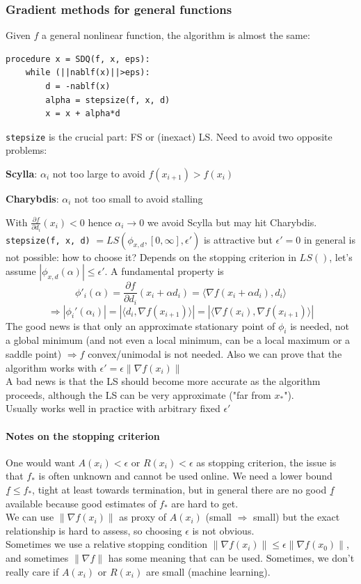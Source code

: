 \documentclass[10pt]{report}
\begin{document}
\subsubsection{Gradient methods for general functions}
Given $f$ a general nonlinear function, the algorithm is almost the same:
\begin{lstlisting}[style=myPython]
procedure x = SDQ(f, x, eps):
	while (||nablf(x)||>eps):
		d = -nablf(x)
		alpha = stepsize(f, x, d)
		x = x + alpha*d
\end{lstlisting}
\texttt{stepsize} is the crucial part: FS or (inexact) LS. Need to avoid two opposite problems:
\begin{list}{}{}
	\item \textbf{Scylla}: $\alpha_i$ not too large to avoid $f(x_{i+1}) > f(x_i)$
	\item \textbf{Charybdis}: $\alpha_i$ not too small to avoid stalling
\end{list}
With $\frac{\partial f}{\partial d_i}(x_i)<0$ hence $\alpha_i\rightarrow 0$ we avoid Scylla but may hit Charybdis.\\
\texttt{stepsize(f, x, d)} $= LS(\phi_{x,d}, [0,\infty], \epsilon')$ is attractive but $\epsilon' = 0$ in general is not possible: how to choose it? Depends on the stopping criterion in $LS()$, let's assume $|\phi_{x,d}(\alpha)| \leq \epsilon'$. A fundamental property is $$\phi'_i(\alpha) = \frac{\partial f}{\partial d_i}(x_i + \alpha d_i) = \langle\nabla f(x_i+\alpha d_i), d_i\rangle$$
$$\Rightarrow |\phi_i'(\alpha_i)| = |\langle d_i, \nabla f(x_{i+1})\rangle| = |\langle \nabla f(x_i),\nabla f(x_{i+1})\rangle|$$
The good news is that only an approximate stationary point of $\phi_i$ is needed, not a global minimum (and not even a local minimum, can be a local maximum or a saddle point) $\Rightarrow f$ convex/unimodal is not needed. Also we can prove that the algorithm works with $\epsilon' = \epsilon \|\nabla f(x_i)\|$\\
A bad news is that the LS should become more accurate as the algorithm proceeds, although the LS can be very approximate ("far from $x_*$").\\
Usually works well in practice with arbitrary fixed $\epsilon'$
\paragraph{Notes on the stopping criterion} One would want $A(x_i)<\epsilon$ or $R(x_i) < \epsilon$ as stopping criterion, the issue is that $f_*$ is often unknown and cannot be used online. We need a lower bound $\underline{f} \leq f_*$, tight at least towards termination, but in general there are no good $\underline{f}$ available because good estimates of $f_*$ are hard to get.\\
We can use $\|\nabla f(x_i)\|$ as proxy of $A(x_i)$ (small $\Rightarrow$ small) but the exact relationship is hard to assess, so choosing $\epsilon$ is not obvious.\\
Sometimes we use a relative stopping condition $\|\nabla f(x_i)\|\leq \epsilon\|\nabla f(x_0)\|$, and sometimes $\|\nabla f\|$ has some meaning that can be used. Sometimes, we don't really care if $A(x_i)$ or $R(x_i)$ are small (machine learning).
\end{document}
